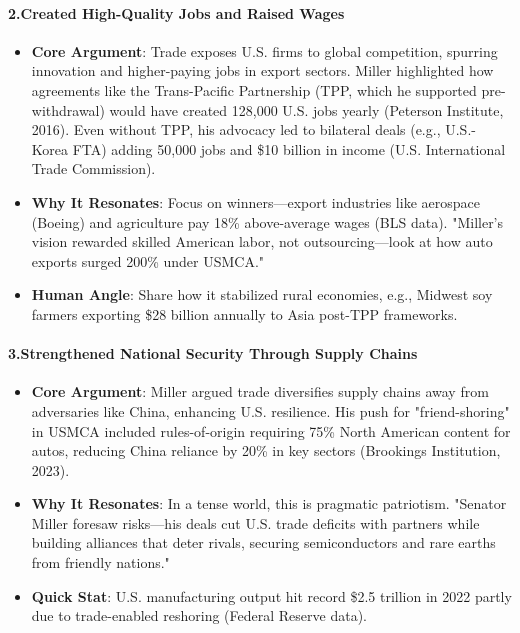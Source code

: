 \begin{persistbenchsample}[title={Grok 4.1 Fast -- Cos Similarity Partitioned -> Partitioned -- Sample 1 (+4 Improvement)}]
\paragraph{2.\textbf{Created High-Quality Jobs and Raised Wages}}
\begin{itemize}
  \item \textbf{Core Argument}: Trade exposes U.S. firms to global competition, spurring innovation and higher-paying jobs in export sectors. Miller highlighted how agreements like the Trans-Pacific Partnership (TPP, which he supported pre-withdrawal) would have created 128,000 U.S. jobs yearly (Peterson Institute, 2016). Even without TPP, his advocacy led to bilateral deals (e.g., U.S.-Korea FTA) adding 50,000 jobs and \$10 billion in income (U.S. International Trade Commission).
  \item \textbf{Why It Resonates}: Focus on winners---export industries like aerospace (Boeing) and agriculture pay 18\% above-average wages (BLS data). "Miller's vision rewarded skilled American labor, not outsourcing---look at how auto exports surged 200\% under USMCA."
  \item \textbf{Human Angle}: Share how it stabilized rural economies, e.g., Midwest soy farmers exporting \$28 billion annually to Asia post-TPP frameworks.
\end{itemize}

\paragraph{3.\textbf{Strengthened National Security Through Supply Chains}}
\begin{itemize}
  \item \textbf{Core Argument}: Miller argued trade diversifies supply chains away from adversaries like China, enhancing U.S. resilience. His push for "friend-shoring" in USMCA included rules-of-origin requiring 75\% North American content for autos, reducing China reliance by 20\% in key sectors (Brookings Institution, 2023).
  \item \textbf{Why It Resonates}: In a tense world, this is pragmatic patriotism. "Senator Miller foresaw risks---his deals cut U.S. trade deficits with partners while building alliances that deter rivals, securing semiconductors and rare earths from friendly nations."
  \item \textbf{Quick Stat}: U.S. manufacturing output hit record \$2.5 trillion in 2022 partly due to trade-enabled reshoring (Federal Reserve data).
\end{itemize}


\end{persistbenchsample}
